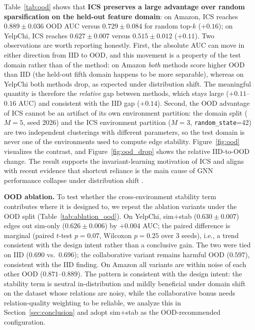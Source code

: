 \documentclass[11pt]{article}
\begin{document}
Table~\ref{tab:ood} shows that \textbf{ICS preserves a large advantage over random sparsification on the held-out feature domain}: on Amazon, ICS reaches $0.889 \pm 0.036$ OOD AUC versus $0.729 \pm 0.084$ for random top-$k$ ($+0.16$); on YelpChi, ICS reaches $0.627 \pm 0.007$ versus $0.515 \pm 0.012$ ($+0.11$). Two observations are worth reporting honestly. First, the absolute AUC can move in either direction from IID to OOD, and this movement is a property of the test domain rather than of the method: on Amazon \emph{both} methods score higher OOD than IID (the held-out fifth domain happens to be more separable), whereas on YelpChi both methods drop, as expected under distribution shift. The meaningful quantity is therefore the \emph{relative} gap between methods, which stays large ($+0.11$--$0.16$ AUC) and consistent with the IID gap ($+0.14$). Second, the OOD advantage of ICS cannot be an artifact of its own environment partition: the domain split ($M{=}5$, seed 2026) and the ICS environment partition ($M{=}3$, \texttt{random\_state}=42) are two independent clusterings with different parameters, so the test domain is never one of the environments used to compute edge stability. Figure~\ref{fig:ood} visualizes the contrast, and Figure~\ref{fig:ood_drop} shows the relative IID-to-OOD change. The result supports the invariant-learning motivation of ICS and aligns with recent evidence that shortcut reliance is the main cause of GNN performance collapse under distribution shift \cite{younesian2026xigl}.

\textbf{OOD ablation.} To test whether the cross-environment stability term contributes where it is designed to, we repeat the ablation variants under the OOD split (Table~\ref{tab:ablation_ood}). On YelpChi, sim$+$stab ($0.630 \pm 0.007$) edges out sim-only ($0.626 \pm 0.006$) by $+0.004$ AUC; the paired difference is marginal (paired $t$-test $p=0.07$, Wilcoxon $p=0.25$ over 3 seeds), i.e., a trend consistent with the design intent rather than a conclusive gain. The two were tied on IID ($0.690$ vs.\ $0.696$); the collaborative variant remains harmful OOD ($0.597$), consistent with the IID finding. On Amazon all variants are within noise of each other OOD ($0.871$--$0.889$). The pattern is consistent with the design intent: the stability term is neutral in-distribution and mildly beneficial under domain shift on the dataset whose relations are noisy, while the collaborative bonus needs relation-quality weighting to be reliable, we analyze this in Section~\ref{sec:conclusion} and adopt sim$+$stab as the OOD-recommended configuration.
\end{document}
